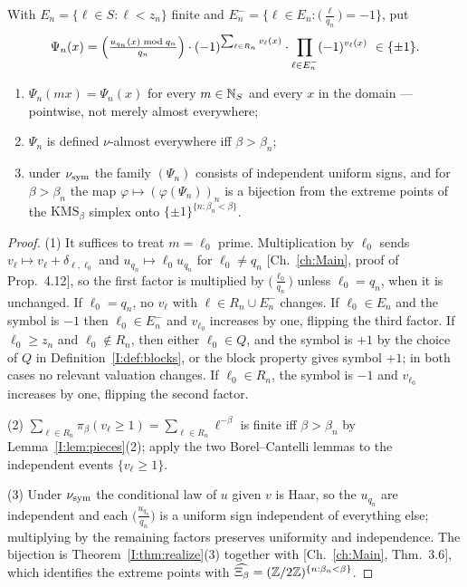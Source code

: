 \begin{definition}\label{I:def:Psin}
With $E_n=\{\ell\in S:\ell<z_n\}$ finite and
$E_n^-=\{\ell\in E_n:\bigl(\tfrac{\ell}{q_n}\bigr)=-1\}$, put
\begin{equation}\label{I:eq:Psin}
\Psi_n(x)=\Bigl(\tfrac{u_{q_n}(x)\bmod q_n}{q_n}\Bigr)\cdot(-1)^{\sum_{\ell\in R_n}v_\ell(x)}\cdot\prod_{\ell\in E_n^-}(-1)^{v_\ell(x)}\ \in\{\pm1\}.
\end{equation}
\end{definition}

\begin{proposition}\label{I:prop:Psin}
\begin{enumerate}
\item $\Psi_n(mx)=\Psi_n(x)$ for every $m\in\mathbb{N}_S$ and every $x$ in the domain --- pointwise,
not merely almost everywhere;
\item $\Psi_n$ is defined $\nu$-almost everywhere iff $\beta>\beta_n$;
\item under $\nu_{\mathrm{sym}}$ the family $(\Psi_n)$ consists of independent uniform signs, and for
$\beta>\beta_n$ the map $\varphi\mapsto(\varphi(\Psi_n))_n$ is a bijection from the extreme
points of the $\mathrm{KMS}_\beta$ simplex onto $\{\pm1\}^{\{n:\beta_n<\beta\}}$.
\end{enumerate}
\end{proposition}

\begin{proof}
(1) It suffices to treat $m=\ell_0$ prime. Multiplication by $\ell_0$ sends
$v_\ell\mapsto v_\ell+\delta_{\ell,\ell_0}$ and $u_{q_n}\mapsto\ell_0u_{q_n}$ for
$\ell_0\ne q_n$ [Ch.~\ref{ch:Main}, proof of Prop.~4.12], so the first factor is multiplied by
$\bigl(\tfrac{\ell_0}{q_n}\bigr)$ unless $\ell_0=q_n$, when it is unchanged. If
$\ell_0=q_n$, no $v_\ell$ with $\ell\in R_n\cup E_n^-$ changes. If $\ell_0\in E_n$ and the
symbol is $-1$ then $\ell_0\in E_n^-$ and $v_{\ell_0}$ increases by one, flipping the third
factor. If $\ell_0\ge z_n$ and $\ell_0\notin R_n$, then either $\ell_0\in Q$, and the symbol
is $+1$ by the choice of $Q$ in Definition~\ref{I:def:blocks}, or the block property gives
symbol $+1$; in both cases no relevant valuation changes. If $\ell_0\in R_n$, the symbol is
$-1$ and $v_{\ell_0}$ increases by one, flipping the second factor.

(2) $\sum_{\ell\in R_n}\pi_\beta(v_\ell\ge1)=\sum_{\ell\in R_n}\ell^{-\beta}$ is finite iff
$\beta>\beta_n$ by Lemma~\ref{I:lem:pieces}(2); apply the two Borel--Cantelli lemmas to the
independent events $\{v_\ell\ge1\}$.

(3) Under $\nu_{\mathrm{sym}}$ the conditional law of $u$ given $v$ is Haar, so the $u_{q_n}$ are
independent and each $\bigl(\tfrac{u_{q_n}}{q_n}\bigr)$ is a uniform sign independent of
everything else; multiplying by the remaining factors preserves uniformity and independence.
The bijection is Theorem~\ref{I:thm:realize}(3) together with [Ch.~\ref{ch:Main}, Thm.~3.6], which
identifies the extreme points with $\widehat{\Xi_\beta}=(\mathbb{Z}/2\mathbb{Z})^{\{n:\beta_n<\beta\}}$.
\end{proof}

